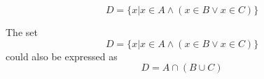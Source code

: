 \documentclass[main.tex]{subfiles}
\begin{document}
\subproblem{}\label{7a}

\[D = \{x | x \in A \land (x \in B \lor x \in C)\}\]
\begin{remark}
	The set
	\[D = \{x | x \in A \land (x \in B \lor x \in C)\}\]
	could also be expressed as
	\[D = A \cap (B \cup C)\]
\end{remark}
\end{document}
